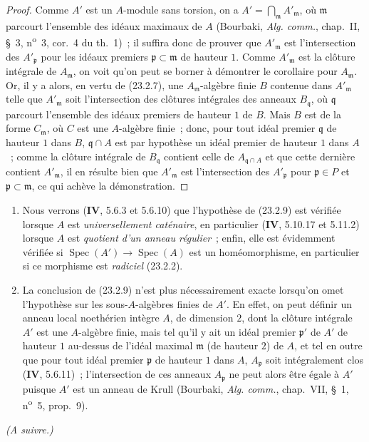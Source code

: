 \begin{proof}
Comme $A'$ est un $A$-module sans torsion, on a
$A'=\bigcap_{\mathfrak m}A'_{\mathfrak m}$, où $\mathfrak m$ parcourt l'ensemble des idéaux
maximaux de $A$ (Bourbaki, \emph{Alg. comm.}, chap.~II, §~3,
n\textsuperscript{o}~3, cor.~4 du th.~1)~;
il suffira donc de prouver que $A'_{\mathfrak m}$ est l'intersection des
$A'_{\mathfrak p}$ pour les idéaux premiers $\mathfrak p\subset\mathfrak m$
de hauteur $1$. Comme $A'_{\mathfrak m}$ est la clôture intégrale de
$A_{\mathfrak m}$, on voit qu'on peut se borner à démontrer le corollaire pour
$A_{\mathfrak m}$. Or, il y a alors, en vertu de (23.2.7), une
$A_{\mathfrak m}$-algèbre
finie $B$ contenue dans $A'_{\mathfrak m}$ telle
que $A'_{\mathfrak m}$ soit l'intersection des clôtures intégrales des anneaux
$B_{\mathfrak q}$, où $\mathfrak q$ parcourt l'ensemble des idéaux premiers de
hauteur $1$ de $B$. Mais $B$ est de la forme $C_{\mathfrak m}$, où $C$ est
une $A$-algèbre finie~; donc, pour tout idéal premier $\mathfrak q$ de hauteur
$1$ dans $B$, $\mathfrak q\cap A$ est par hypothèse un idéal premier de
hauteur $1$ dans $A$~; comme la clôture intégrale de $B_{\mathfrak q}$
contient celle de $A_{\mathfrak q\cap A}$ et que cette dernière contient
$A'_{\mathfrak m}$, il en résulte bien que $A'_{\mathfrak m}$ est
l'intersection des $A'_{\mathfrak p}$ pour $\mathfrak p\in P$ et
$\mathfrak p\subset\mathfrak m$, ce qui achève la démonstration.
\end{proof}

\begin{remarks}[23.2.10]
\label{0.23.2.10-fr}
\begin{enumerate}
  \item[(i)] Nous verrons (\textbf{IV}, 5.6.3 et 5.6.10) que l'hypothèse de (23.2.9)
  est vérifiée lorsque $A$ est \emph{universellement caténaire}, en particulier
  (\textbf{IV}, 5.10.17 et 5.11.2) lorsque $A$ est \emph{quotient d'un anneau
  régulier}~; enfin, elle est évidemment vérifiée si
  $\operatorname{Spec}(A')\to\operatorname{Spec}(A)$ est un homéomorphisme,
  en particulier si ce morphisme est \emph{radiciel} (23.2.2).

  \item[(ii)] La conclusion de (23.2.9) n'est plus nécessairement exacte
  lorsqu'on omet l'hypothèse sur les sous-$A$-algèbres finies de $A'$. En
  effet, on peut définir un anneau local noethérien intègre $A$, de dimension
  $2$, dont la clôture intégrale $A'$ est une $A$-algèbre finie, mais tel qu'il
  y ait un idéal premier $\mathfrak p'$ de $A'$ de hauteur $1$ au-dessus de
  l'idéal maximal $\mathfrak m$ (de hauteur $2$) de $A$, et tel en outre que
  pour tout idéal premier $\mathfrak p$ de hauteur $1$ dans $A$,
  $A_{\mathfrak p}$ soit intégralement clos (\textbf{IV}, 5.6.11)~; l'intersection de
  ces anneaux $A_{\mathfrak p}$ ne peut alors être égale à $A'$ puisque $A'$
  est un anneau de Krull (Bourbaki, \emph{Alg. comm.}, chap.~VII, §~1,
  n\textsuperscript{o}~5, prop.~9).
\end{enumerate}
\end{remarks}

\begin{flushright}
\emph{(A suivre.)}
\end{flushright}
